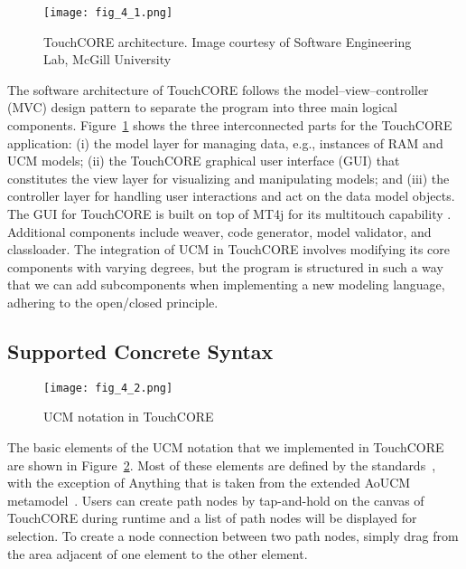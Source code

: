 \begin{figure}
	\centering
	\texttt{[image: fig\_4\_1.png]}
	\caption[TouchCORE architecture]{TouchCORE architecture. Image courtesy of Software Engineering Lab, McGill University}
	\label{fig:4.1}
\end{figure}

The software architecture of TouchCORE follows the model–view–controller (MVC) design pattern to separate the program into three main logical components. Figure~\ref{fig:4.1} shows the three interconnected parts for the TouchCORE application: (i) the model layer for managing data, e.g., instances of RAM and UCM models; (ii) the TouchCORE graphical user interface (GUI) that constitutes the view layer for visualizing and manipulating models; and (iii) the controller layer for handling user interactions and act on the data model objects. The GUI for TouchCORE is built on top of MT4j for its multitouch capability \cite{laufs2010mt4j}. Additional components include weaver, code generator, model validator, and classloader. The integration of UCM in TouchCORE involves modifying its core components with varying degrees, but the program is structured in such a way that we can add subcomponents when implementing a new modeling language, adhering to the open/closed principle.

\subsection{Supported Concrete Syntax}

\begin{figure}[h]
	\centering
	\texttt{[image: fig\_4\_2.png]}
	\caption{UCM notation in TouchCORE}
	\label{fig:4.2}
\end{figure}

The basic elements of the UCM notation that we implemented in TouchCORE are shown in Figure~\ref{fig:4.2}. Most of these elements are defined by the standards~\cite{itu2012151}, with the exception of {\cls Anything} that is taken from the extended AoUCM metamodel~\cite{mussbacher2011aspect}. Users can create path nodes by tap-and-hold on the canvas of TouchCORE during runtime and a list of path nodes will be displayed for selection. To create a node connection between two path nodes, simply drag from the area adjacent of one element to the other element.

